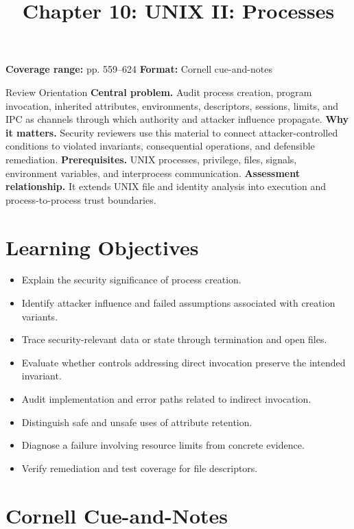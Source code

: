 \documentclass[11pt,letterpaper]{article}
\title{Chapter 10: UNIX II: Processes}
\author{}
\date{}
\begin{document}
\maketitle

\begin{center}
\small\color{Meta}\textbf{Coverage range:} pp. 559--624 \quad\textbullet\quad \textbf{Format:} Cornell cue-and-notes
\end{center}
\vspace{0.25em}
\begin{CornellOverviewBox}{Review Orientation}
\textbf{Central problem.} Audit process creation, program invocation, inherited attributes, environments, descriptors, sessions, limits, and IPC as channels through which authority and attacker influence propagate.
\textbf{Why it matters.} Security reviewers use this material to connect attacker-controlled conditions to violated invariants, consequential operations, and defensible remediation.
\textbf{Prerequisites.} UNIX processes, privilege, files, signals, environment variables, and interprocess communication.
\textbf{Assessment relationship.} It extends UNIX file and identity analysis into execution and process-to-process trust boundaries.
\end{CornellOverviewBox}
\section{Learning Objectives}
\begin{itemize}
\item Explain the security significance of process creation.
\item Identify attacker influence and failed assumptions associated with creation variants.
\item Trace security-relevant data or state through termination and open files.
\item Evaluate whether controls addressing direct invocation preserve the intended invariant.
\item Audit implementation and error paths related to indirect invocation.
\item Distinguish safe and unsafe uses of attribute retention.
\item Diagnose a failure involving resource limits from concrete evidence.
\item Verify remediation and test coverage for file descriptors.
\end{itemize}
\section{Cornell Cue-and-Notes}
\end{document}
